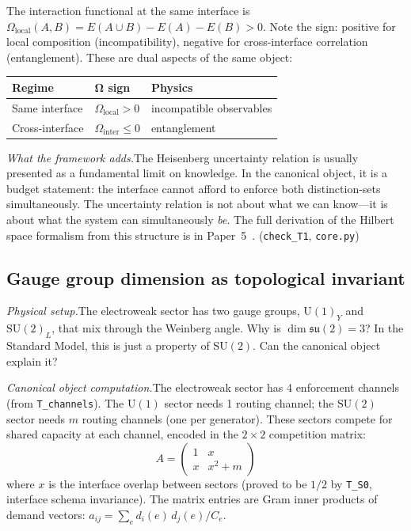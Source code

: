 \documentclass[11pt]{article}
\newcommand{\SU}{\mathrm{SU}}
\newcommand{\U}{\mathrm{U}}
\begin{document}
The interaction functional at the same interface is $\Omega_{\mathrm{local}}(A,B) = E(A \cup B) - E(A) - E(B) > 0$.  Note the sign: positive for local composition (incompatibility), negative for cross-interface correlation (entanglement).  These are dual aspects of the same object:

\smallskip
\begin{center}
\small
\begin{tabular}{lll}
\toprule
\textbf{Regime} & $\boldsymbol{\Omega}$ \textbf{sign} & \textbf{Physics} \\
\midrule
Same interface & $\Omega_{\mathrm{local}} > 0$ & incompatible observables \\
Cross-interface & $\Omega_{\mathrm{inter}} \le 0$ & entanglement \\
\bottomrule
\end{tabular}
\end{center}
\smallskip

\textit{What the framework adds.}\quad The Heisenberg uncertainty relation is usually presented as a fundamental limit on knowledge.  In the canonical object, it is a budget statement: the interface cannot afford to enforce both distinction-sets simultaneously.  The uncertainty relation is not about what we can know---it is about what the system can simultaneously \emph{be}.  The full derivation of the Hilbert space formalism from this structure is in Paper~5~\cite{P5}.  (\texttt{check\_T1}, \texttt{core.py})


\subsection{Gauge group dimension as topological invariant}

\textit{Physical setup.}\quad The electroweak sector has two gauge groups, $\U(1)_Y$ and $\SU(2)_L$, that mix through the Weinberg angle.  Why is $\dim\mathfrak{su}(2) = 3$?  In the Standard Model, this is just a property of $\SU(2)$.  Can the canonical object explain it?

\textit{Canonical object computation.}\quad The electroweak sector has 4 enforcement channels (from \texttt{T\_channels}).  The $\U(1)$ sector needs 1 routing channel; the $\SU(2)$ sector needs $m$ routing channels (one per generator).  These sectors compete for shared capacity at each channel, encoded in the $2\times 2$ competition matrix:
\begin{equation}
A = \begin{pmatrix} 1 & x \\ x & x^2 + m \end{pmatrix}
\end{equation}
where $x$ is the interface overlap between sectors (proved to be $1/2$ by \texttt{T\_S0}, interface schema invariance).  The matrix entries are Gram inner products of demand vectors: $a_{ij} = \sum_e d_i(e)\, d_j(e)/C_e$.
\end{document}
